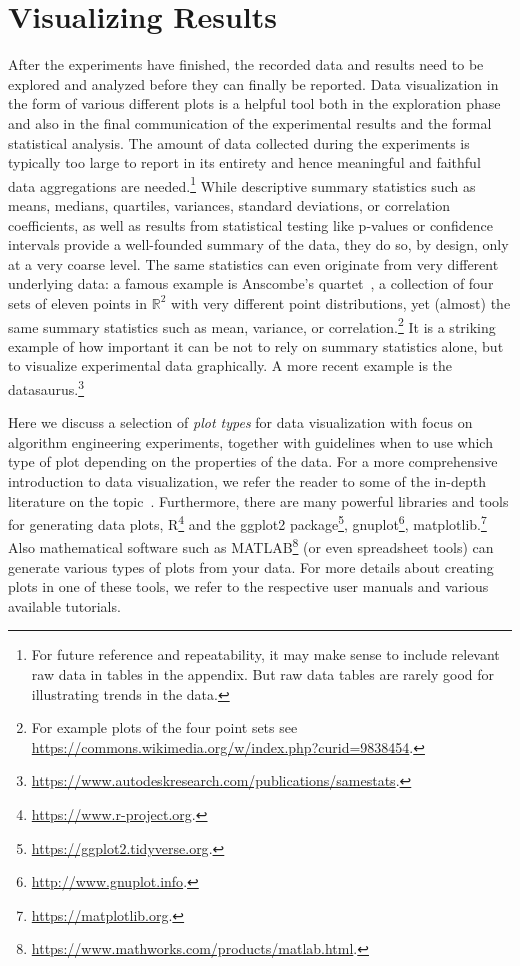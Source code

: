 \documentclass[algorithms,article,submit,moreauthors,pdftex]{Definitions/mdpi}
\newcounter{guideline}
\begin{document}
\section{Visualizing Results}
\label{sec:viz}
%
After the experiments have finished, the recorded data and results need to be explored and analyzed before they can finally be reported.
Data visualization in the form of various different plots is a helpful tool both in the exploration phase and also in the final communication of the experimental results and the formal statistical analysis.
The amount of data collected during the experiments is typically too large to report in its entirety and hence meaningful and faithful data aggregations are
needed.\footnote{For future reference and repeatability, it may make sense to include relevant raw data in tables
in the appendix. But raw data tables are rarely good for illustrating trends in the data.}
While descriptive summary statistics such as means, medians, quartiles, variances, standard deviations, or correlation coefficients, as well as results from statistical testing like p-values or confidence intervals  provide a well-founded summary of the data, they do so, by design, only at a very coarse level.
The same statistics can even originate from very different underlying data:
a famous example is Anscombe's quartet~\cite{anscombe73}, a collection of four sets of eleven points in $\mathbb R^2$ with very different point distributions, yet (almost) the same summary statistics such as mean, variance, or correlation.\footnote{For example plots of the four point sets see \url{https://commons.wikimedia.org/w/index.php?curid=9838454}.}
It is a striking example of how important it can be not to rely on summary statistics alone, but to visualize experimental data graphically. A more recent example is the datasaurus.\footnote{\url{https://www.autodeskresearch.com/publications/samestats}.}

Here we discuss a selection of \emph{plot types} for data visualization with focus on algorithm engineering experiments, together with guidelines when to use which type of plot depending on the properties of the data.
For a more comprehensive introduction to data visualization, we refer the reader to some of the in-depth literature on the topic~\cite{h-dvpi-18,s-pdfea-02,t-vdqi-01}.
Furthermore, there are many powerful libraries and tools for generating data plots,
\eg R\footnote{\url{https://www.r-project.org}.} and the ggplot2 package\footnote{\url{https://ggplot2.tidyverse.org}.}, gnuplot\footnote{\url{http://www.gnuplot.info}.}, matplotlib.\footnote{\url{https://matplotlib.org}.} Also mathematical software such as MATLAB\footnote{\url{https://www.mathworks.com/products/matlab.html}.} (or even spreadsheet tools) can generate various types of plots from your data.
For more details about creating plots in one of these tools, we refer to the respective user manuals and various available tutorials.
\end{document}
